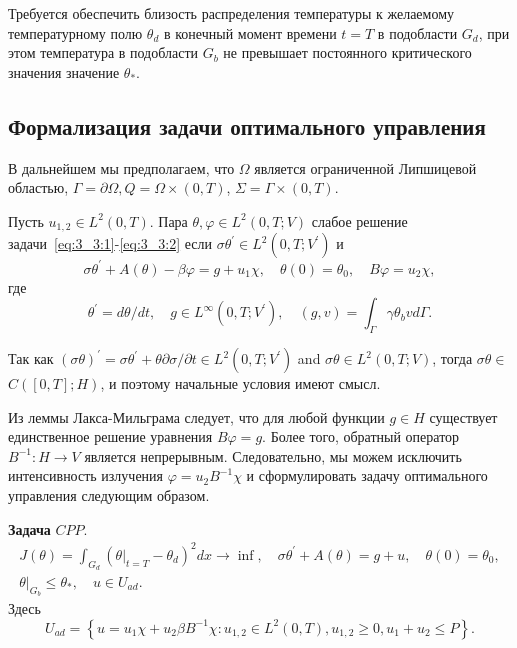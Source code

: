 Требуется обеспечить близость распределения температуры к желаемому температурному полю $\theta_{d}$
в конечный момент времени $t=T$ в подобласти $G_{d}$, при этом температура в подобласти $G_{b}$
не превышает постоянного критического значения значение $\theta_{*}$.

\subsection{Формализация задачи оптимального управления}\label{subsec:ch3:sec3:subsec2}

В дальнейшем мы предполагаем, что $\Omega $ является ограниченной Липшицевой областью,
$\Gamma =\partial \Omega, Q =\Omega \times(0, T)$, $\Sigma=\Gamma \times(0, T)$.

\begin{definition}
    Пусть $u_{1,2} \in L^{2}(0, T)$.
    Пара $\theta, \varphi \in L^{2}(0, T ; V)$ слабое решение задачи~\eqref{eq:3_3:1}-\eqref{eq:3_3:2} если
    $\sigma \theta^{\prime} \in L^{2}\left(0, T ; V^{\prime}\right)$ и
    \begin{equation}
        \label{eq:3_3:3}
        \sigma \theta^{\prime}+A(\theta)-\beta \varphi=g+u_{1} \chi,
        \quad \theta(0)=\theta_{0}, \quad B \varphi=u_{2} \chi,
    \end{equation}
    где
    \[
        \theta^{\prime}=d \theta / d t, \quad g \in L^{\infty}\left(0, T ; V^{\prime}\right),
        \quad(g, v)=\int_{\Gamma} \gamma \theta_{b} v d \Gamma.
    \]
\end{definition}

\begin{remark}
    Так как $(\sigma \theta)^{\prime}=\sigma \theta^{\prime}+\theta
    \partial \sigma / \partial t \in L^{2}\left(0, T ; V^{\prime}\right)$ and $\sigma
    \theta \in L^{2}(0, T ; V)$, тогда $\sigma \theta \in$ $C([0, T] ; H)$,
    и поэтому начальные условия имеют смысл.
\end{remark}

Из леммы Лакса-Мильграма следует, что для любой функции $g \in H$ существует единственное
решение уравнения $B\varphi= g$.
Более того, обратный оператор $B^{-1}: H \rightarrow V$ является непрерывным.
Следовательно, мы можем исключить интенсивность излучения $\varphi=u_{2} B^{-1} \chi$
и сформулировать задачу оптимального управления следующим образом.


\textbf{Задача} $CPP$.
\[
    \begin{gathered}
        J(\theta)=\int_{G_{d}}\left(\left.\theta\right|_{t=T}
        - \theta_{d}\right)^{2} d x \rightarrow \inf,
        \quad \sigma \theta^{\prime}+A(\theta)=g+u, \quad \theta(0)=\theta_{0}, \\
        \left.\theta\right|_{G_{b}} \leq \theta_{*}, \quad u \in U_{a d}.
    \end{gathered}
\]
Здесь
\[
    U_{a d}=\left\{u=u_{1} \chi+u_{2} \beta B^{-1} \chi: u_{1,2} \in L^{2}(0, T), u_{1,2}
    \geq 0, u_{1}+u_{2} \leq P\right\}.
\]


